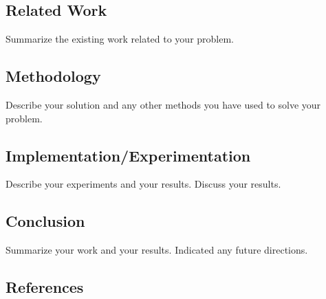 \documentclass[letterpaper,twocolumn,10pt]{article}
\begin{document}
\subsection*{Related Work}

Summarize the existing work related to your problem.

\subsection*{Methodology}

Describe your solution and any other methods you have used to solve your problem.

\subsection*{Implementation/Experimentation}

Describe your experiments and your results. Discuss your results.

\subsection*{Conclusion}

Summarize your work and your results. Indicated any future directions.

\subsection*{References}

\printbibliography
\end{document}
